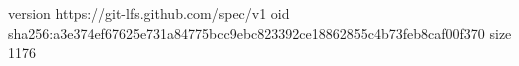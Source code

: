 version https://git-lfs.github.com/spec/v1
oid sha256:a3e374ef67625e731a84775bcc9ebc823392ce18862855c4b73feb8caf00f370
size 1176
